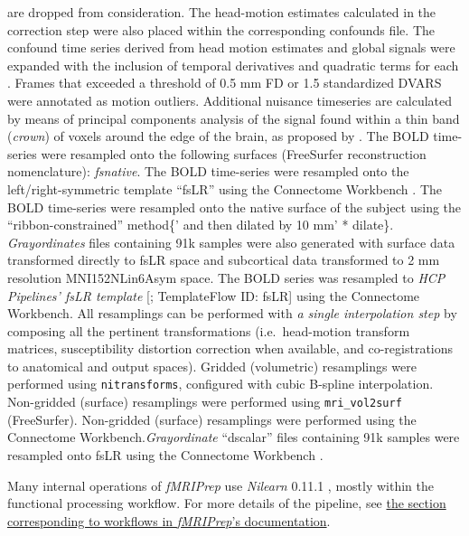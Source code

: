 \documentclass[
]{article}
\begin{document}
\begin{description}
are dropped from consideration. The head-motion estimates calculated in
the correction step were also placed within the corresponding confounds
file. The confound time series derived from head motion estimates and
global signals were expanded with the inclusion of temporal derivatives
and quadratic terms for each \citep{confounds_satterthwaite_2013}.
Frames that exceeded a threshold of 0.5 mm FD or 1.5 standardized DVARS
were annotated as motion outliers. Additional nuisance timeseries are
calculated by means of principal components analysis of the signal found
within a thin band (\emph{crown}) of voxels around the edge of the
brain, as proposed by \citep{patriat_improved_2017}. The BOLD
time-series were resampled onto the following surfaces (FreeSurfer
reconstruction nomenclature): \emph{fsnative}. The BOLD time-series were
resampled onto the left/right-symmetric template ``fsLR'' using the
Connectome Workbench \citep{hcppipelines}. The BOLD time-series were
resampled onto the native surface of the subject using the
``ribbon-constrained'' method\{' and then dilated by 10 mm' * dilate\}.
\emph{Grayordinates} files \citep{hcppipelines} containing 91k samples
were also generated with surface data transformed directly to fsLR space
and subcortical data transformed to 2 mm resolution MNI152NLin6Asym
space. The BOLD series was resampled to \emph{HCP Pipelines' fsLR
template} {[}\citet{fslr}; TemplateFlow ID: fsLR{]} using the Connectome
Workbench. All resamplings can be performed with \emph{a single
interpolation step} by composing all the pertinent transformations
(i.e.~head-motion transform matrices, susceptibility distortion
correction when available, and co-registrations to anatomical and output
spaces). Gridded (volumetric) resamplings were performed using
\texttt{nitransforms}, configured with cubic B-spline interpolation.
Non-gridded (surface) resamplings were performed using
\texttt{mri\_vol2surf} (FreeSurfer). Non-gridded (surface) resamplings
were performed using the Connectome Workbench.\emph{Grayordinate}
``dscalar'' files containing 91k samples were resampled onto fsLR using
the Connectome Workbench \citep{hcppipelines}.
\end{description}

Many internal operations of \emph{fMRIPrep} use \emph{Nilearn} 0.11.1
\citep[RRID:SCR\_001362]{nilearn}, mostly within the functional
processing workflow. For more details of the pipeline, see
\href{https://fmriprep.readthedocs.io/en/latest/workflows.html}{the
section corresponding to workflows in \emph{fMRIPrep}'s documentation}.
\end{document}
